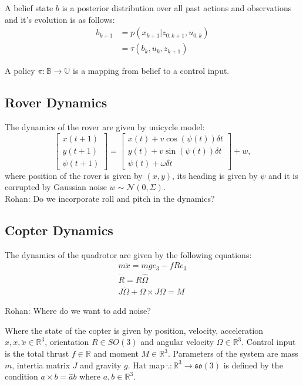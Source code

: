 \documentclass[conference]{IEEEtran}
\newcommand{\rohan}[1]{{\color{blue} Rohan: #1}}
\begin{document}
A belief state $b$ is a posterior distribution over all past actions and observations and it's evolution is as follows:
\begin{align}
    b_{k+1} &= p(x_{k+1}|z_{0:k+1}, u_{0:k}) \\
            &= \tau(b_k,u_k,z_{k+1})
\end{align} 

A policy $\pi : \mathbb{B} \to \mathbb{U}$ is a mapping from belief to a control input.

\subsection{Rover Dynamics}
The dynamics of the rover are given by unicycle model:
\begin{equation}
    \begin{bmatrix}
        x(t+1) \\
        y(t+1) \\
        \psi(t+1)
    \end{bmatrix} = \begin{bmatrix}x(t) + v \cos(\psi(t)) \delta{t}\\ y(t) + v \sin(\psi(t)) \delta{t}\\ \psi(t) + \omega \delta{t} \end{bmatrix} + w,
\end{equation}
where position of the rover is given by $(x,y)$, its heading is given by $\psi$ and it is corrupted by Gaussian noise $w \sim \mathcal{N}(0,\Sigma)$. \\
\rohan{Do we incorporate roll and pitch in the dynamics?}

\subsection{Copter Dynamics}
The dynamics of the quadrotor are given by the following equations:
\begin{gather}
m\ddot{x} = mge_{3} - fRe_{3} \\
\dot{R} = R\hat{\Omega} \\
J\dot{\Omega} + \Omega \times J\Omega = M 
\end{gather}

\rohan{Where do we want to add noise?}

Where the state of the copter is given by position, velocity, acceleration $x, \dot{x}, \ddot{x} \in \mathbb{R}^3$, orientation $R \in SO(3)$ and angular velocity $\Omega \in \mathbb{R}^3$.
Control input is the total thrust $f \in \mathbb{R}$ and moment $M \in \mathbb{R}^3$.
Parameters of the system are mass $m$, intertia matrix $J$ and gravity $g$.
Hat map $\hat{.}: \mathbb{R}^3 \to \mathfrak{so}(3)$ is defined by the condition $a \times b = \hat{a}b$ where $a,b\in \mathbb{R}^3$.
\end{document}
